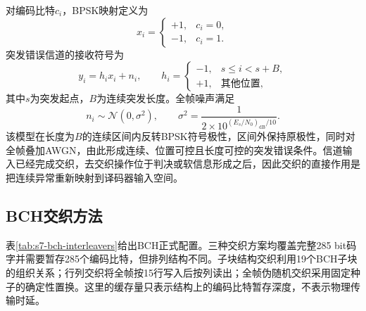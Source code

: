 对编码比特$c_i$，BPSK映射定义为
\begin{equation}
  x_i=\begin{cases}
  +1, & c_i=0,\\
  -1, & c_i=1.
  \end{cases}
\end{equation}
突发错误信道的接收符号为
\begin{equation}
  y_i=h_i x_i+n_i,
  \qquad
  h_i=\begin{cases}
  -1, & s\le i<s+B,\\
  +1, & \text{其他位置},
  \end{cases}
\end{equation}
其中$s$为突发起点，$B$为连续突发长度。全帧噪声满足
\begin{equation}
  n_i\sim\mathcal{N}(0,\sigma^2),
  \qquad
  \sigma^2=\frac{1}{2\times10^{(E_s/N_0)_{\mathrm{dB}}/10}}.
\end{equation}
该模型在长度为$B$的连续区间内反转BPSK符号极性，区间外保持原极性，同时对全帧叠加AWGN，由此形成连续、位置可控且长度可控的突发错误条件。信道输入已经完成交织，去交织操作位于判决或软信息形成之后，因此交织的直接作用是把连续异常重新映射到译码器输入空间。

\subsection{BCH交织方法}

表\ref{tab:s7-bch-interleavers}给出BCH正式配置。三种交织方案均覆盖完整285 bit码字并需要暂存285个编码比特，但排列结构不同。子块结构交织利用19个BCH子块的组织关系；行列交织将全帧按15行写入后按列读出；全帧伪随机交织采用固定种子的确定性置换。这里的缓存量只表示结构上的编码比特暂存深度，不表示物理传输时延。

\begin{table}[htbp]
  \centering
  \caption{BCH正式交织方案定义}
  \label{tab:s7-bch-interleavers}
  \small
\end{table}

